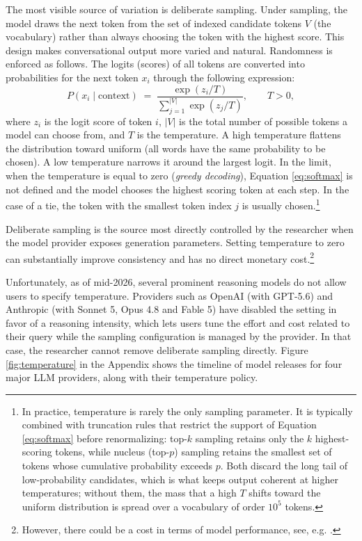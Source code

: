 \documentclass[11pt]{article}
\begin{document}
The most visible source of variation is deliberate sampling. Under sampling, the model draws the next token from the set of indexed candidate tokens $V$ (the vocabulary) rather than always choosing the token with the highest score. This design makes conversational output more varied and natural. Randomness is enforced as follows. The logits (scores) of all tokens are converted into probabilities for the next token $x_i$ through the following expression:
\begin{equation}
\label{eq:softmax}
P(x_i \mid \text{context}) \;=\; \frac{\exp(z_i/T)}{\sum_{j=1}^{|V|} \exp(z_j/T)},
\qquad T > 0,
\end{equation}
where $z_i$ is the logit score of token $i$, $|V|$ is the total number of possible tokens a model can choose from, and $T$ is the temperature. A high temperature flattens the distribution toward uniform (all words have the same probability to be chosen). A low temperature narrows it around the largest logit. In the limit, when the temperature is equal to zero (\textit{greedy decoding}), Equation \eqref{eq:softmax} is not defined and the model chooses the highest scoring token at each step. In the case of a tie, the token with the smallest token index $j$ is usually chosen.\footnote{In practice, temperature is rarely the only sampling parameter. It is typically combined with truncation rules that restrict the support of Equation \eqref{eq:softmax} before renormalizing: top-$k$ sampling retains only the $k$ highest-scoring tokens, while nucleus (top-$p$) sampling retains the smallest set of tokens whose cumulative probability exceeds $p$. Both discard the long tail of low-probability candidates, which is what keeps output coherent at higher temperatures; without them, the mass that a high $T$ shifts toward the uniform distribution is spread over a vocabulary of order $10^5$ tokens.}\medskip

Deliberate sampling is the source most directly controlled by the researcher when the model provider exposes generation parameters. Setting temperature to zero can substantially improve consistency and has no direct monetary cost.\footnote{However, there could be a cost in terms of model performance, see, e.g. \cite{du2025optimizing}.}\medskip

Unfortunately, as of mid-2026, several prominent reasoning models do not allow users to specify temperature. Providers such as OpenAI (with GPT-5.6) and Anthropic (with Sonnet 5, Opus 4.8 and Fable 5) have disabled the setting in favor of a reasoning intensity, which lets users tune the effort and cost related to their query while the sampling configuration is managed by the provider. In that case, the researcher cannot remove deliberate sampling directly. Figure \ref{fig:temperature} in the Appendix shows the timeline of model releases for four major LLM providers, along with their temperature policy. \medskip
\end{document}
